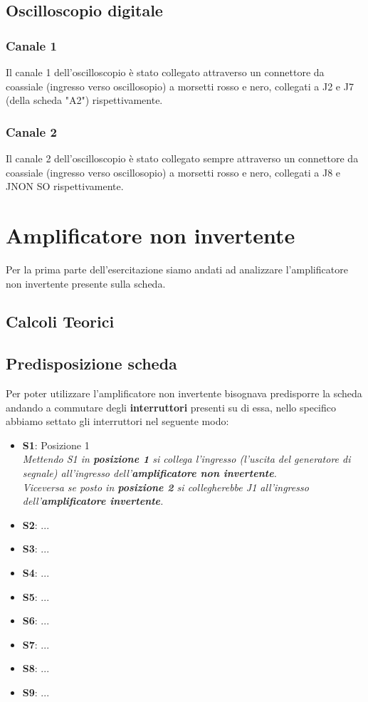 \documentclass{article}
\begin{document}
\subsection{Oscilloscopio digitale}
\subsubsection{Canale 1} Il canale 1 dell'oscilloscopio è stato collegato attraverso un connettore da coassiale (ingresso verso oscillosopio) a morsetti rosso e nero, collegati a J2 e J7 (della scheda "A2") rispettivamente.
\subsubsection{Canale 2} Il canale 2 dell'oscilloscopio è stato collegato sempre attraverso un connettore da coassiale (ingresso verso oscillosopio) a morsetti rosso e nero, collegati a J8 e JNON SO rispettivamente.

\section{Amplificatore non invertente}
Per la prima parte dell'esercitazione siamo andati ad analizzare l'amplificatore non invertente presente sulla scheda.
\subsection{Calcoli Teorici}
\subsection{Predisposizione scheda}
Per poter utilizzare l'amplificatore non invertente bisognava predisporre la scheda andando a commutare degli \textbf{interruttori} presenti su di essa, nello specifico abbiamo settato gli interruttori nel seguente modo:
\begin{itemize}
	\item \textbf{S1}: Posizione 1\\ \textit{Mettendo S1 in \textbf{posizione 1} si collega l'ingresso (l'uscita del generatore di segnale) all'ingresso dell'\textbf{amplificatore non invertente}.\\Viceversa se posto in \textbf{posizione 2} si collegherebbe J1 all'ingresso dell'\textbf{amplificatore invertente}.}
	\item \textbf{S2}: ...
	\item \textbf{S3}: ...
	\item \textbf{S4}: ...
	\item \textbf{S5}: ...
	\item \textbf{S6}: ...
	\item \textbf{S7}: ...
	\item \textbf{S8}: ...
	\item \textbf{S9}: ...
\end{itemize}
\end{document}
